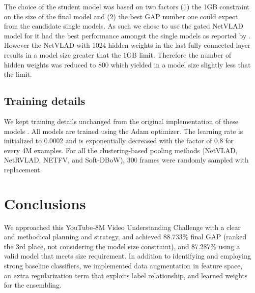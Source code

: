 \documentclass[runningheads]{llncs}
\begin{document}
The choice of the student model was based on two factors (1) the 1GB constraint on the size of the final model and (2) the best GAP number one could expect from the candidate single models.
As such we chose to use the gated NetVLAD model for it had the best performance amongst the single models as reported by \cite{miech2017}.
However the NetVLAD with 1024 hidden weights in the last fully connected layer results in a model size greater that the 1GB limit.
Therefore the number of hidden weights was reduced to 800 which yielded in a model size slightly less that the limit.

\subsection{Training details}
We kept training details unchanged from the original implementation of these models \cite{miech2017}.
All models are trained using the Adam optimizer.
The learning rate is initialized to 0.0002 and is exponentially decreased with the factor of 0.8 for every 4M examples.
For all the clustering-based pooling methods (NetVLAD, NetRVLAD, NETFV, and Soft-DBoW), 300 frames were randomly sampled with replacement.


\section{Conclusions}
We approached this YouTube-8M Video Understanding Challenge with a clear and methodical planning and strategy, and achieved 88.733\% final GAP (ranked the 3rd place, not considering the model size constraint), and 87.287\% using a valid model that meets size requirement.
In addition to identifying and employing strong baseline classifiers, we implemented data augmentation in feature space, an extra regularization term that exploits label relationship, and learned weights for the ensembling.

\end{document}
